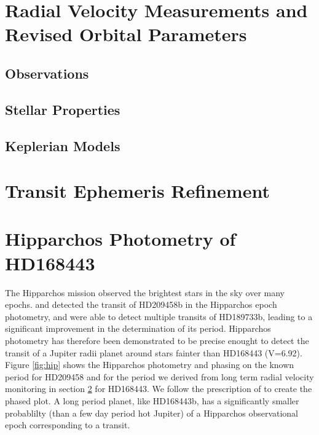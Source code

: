 \documentclass[12pt,preprint]{emulateapj}
\begin{document}

\section{Radial Velocity Measurements and Revised Orbital Parameters}
\label{revisedop}


\subsection{Observations}


\subsection{Stellar Properties}
\label{steprop}




\subsection{Keplerian Models}






\section{Transit Ephemeris Refinement}
\label{ephemeris}



\section{Hipparchos Photometry of HD168443}
The Hipparchos mission observed the brightest stars in the sky over many epochs. \citet{Robichon00} and \citet{Castellano00} detected the transit of HD209458b in the Hipparchos epoch photometry, and \citet{Hebrard06} were able to detect multiple transits of HD189733b, leading to a significant improvement in the determination of its period.  Hipparchos photometry has therefore been demonstrated to be precise enought to detect the transit of a Jupiter radii planet around stars fainter than HD168443 (V=6.92).  Figure \ref{fig:hip} shows the Hipparchos photometry and phasing on the known period for HD209458 and for the period we derived from long term radial velocity monitoring in section \ref{ephemeris} for HD168443. We follow the prescription of \citet{Robichon00} to create the phased plot. A long period planet, like HD168443b, has a significantly smaller probablilty (than a few day period hot Jupiter) of a Hipparchos observational epoch corresponding to a transit. 
\end{document}
